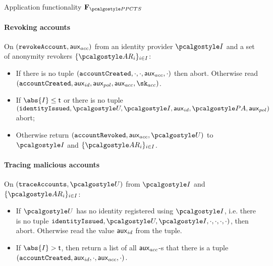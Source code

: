 \documentclass[runningheads,10pt]{llncs}
\numberwithin{equation}{section}
\begin{document}
\begin{funcbox}{Application functionality $\func{\PPCTS}$}
  \paragraph{Revoking accounts}
  On $(\mathtt{revokeAccount}, \mathsf{aux}_{acc})$ from an identity provider $\idprov$ and a set
  of anonymity revokers $\smallset{\ar_i}_{i \in I}$:
  \begin{itemize}
  \item If there is no tuple $(\mathtt{accountCreated}, \cdot, \cdot, \mathsf{aux}_{acc}, \cdot)$
    then abort. Otherwise read $(\accountCreated, \auxid, \auxpol, \auxacc,
    \skacc)$.
  \item If $\abs{I} \leq \thresholdar$ or there is no tuple $(\identityIssued,
    \user, \idprov, \auxid, \polas, \auxpol)$ abort;
  \item Otherwise return $(\accountRevoked, \auxacc, \user)$ to $\idprov$ and
    $\smallset{\ar_i}_{i \in I}$.
  \end{itemize}

  \paragraph{Tracing malicious accounts}
  On $(\traceAccounts, \user)$ from $\idprov$ and $\smallset{\ar_i}_{i \in I}$:
  \begin{itemize}
  \item If $\user$ has no identity registered using $\idprov$, i.e. there is no
    tuple $\identityIssued, \user, \idprov, \cdot, \cdot, \cdot, \cdot)$, then
    abort. Otherwise read the value $\mathsf{aux}_{id}$ from the tuple.
  \item If $\abs{I} > \thresholdar$, then return a list of all $\mathsf{aux}_{acc}$-s that
    there is a tuple $(\mathtt{accountCreated}, \mathsf{aux}_{id}, \cdot, \mathsf{aux}_{acc}, \cdot)$.
  \end{itemize}
\end{funcbox}
\end{document}
